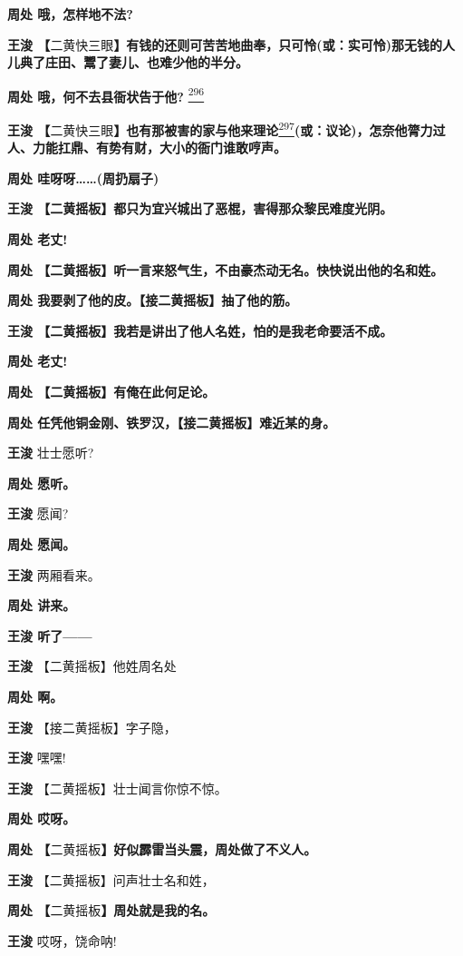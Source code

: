 \textbf{周处 哦，怎样地不法?}

\textbf{王浚
【}二黄快三眼\textbf{】有钱的还则可苦苦地曲奉，只可怜(或：实可怜)那无钱的人儿典了庄田、鬻了妻儿、也难少他的半分。}

\textbf{周处 哦，何不去县衙状告于他?}
\protect\hyperlink{fn296}{\textsuperscript{296}}

\textbf{王浚
【}二黄快三眼\textbf{】也有那被害的家与他来理论}\protect\hyperlink{fn297}{\textsuperscript{297}}\textbf{(或：议论)，怎奈他膂力过人、力能扛鼎、有势有财，大小的衙门谁敢哼声。}

\textbf{周处 哇呀呀\ldots{}\ldots{}(周扔扇子)}

\textbf{王浚 【二黄摇板】都只为宜兴城出了恶棍，害得那众黎民难度光阴。}

\textbf{周处 老丈!}

\textbf{周处
【二黄摇板】听一言来怒气生，不由豪杰动无名。快快说出他的名和姓。}

\textbf{周处 我要剥了他的皮。【接二黄摇板】抽了他的筋。}

\textbf{王浚 【二黄摇板】我若是讲出了他人名姓，怕的是我老命要活不成。}

\textbf{周处 老丈!}

\textbf{周处 【二黄摇板】有俺在此何足论。}

\textbf{周处 任凭他铜金刚、铁罗汉，【接二黄摇板】难近某的身。}

\textbf{王浚} 壮士愿听?

\textbf{周处 愿听。}

\textbf{王浚} 愿闻?

\textbf{周处 愿闻。}

\textbf{王浚} 两厢看来。

\textbf{周处 讲来。}

\textbf{王浚 听了------}

\textbf{王浚} 【二黄摇板】他姓周名处

\textbf{周处 啊。}

\textbf{王浚} 【接二黄摇板】字子隐，

\textbf{王浚} 嘿嘿!

\textbf{王浚} 【二黄摇板】壮士闻言你惊不惊。

\textbf{周处 哎呀。}

\textbf{周处 【}二黄摇板\textbf{】好似霹雷当头震，周处做了不义人。}

\textbf{王浚} 【二黄摇板】问声壮士名和姓，

\textbf{周处 【}二黄摇板\textbf{】周处就是我的名。}

\textbf{王浚} 哎呀，饶命呐!

